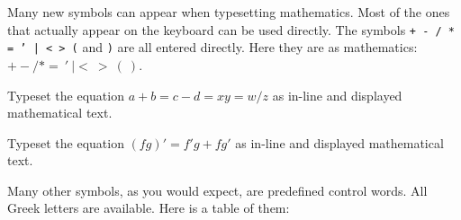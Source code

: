 Many new symbols can appear when typesetting mathematics.  Most 
of the ones that actually appear on the keyboard can be used 
directly. The symbols {\tt + - / * = ' | < > (} and {\tt )} are 
all entered directly. Here they are as mathematics: $+ - / * =\> 
'\> | <\> >\> ( \> )$. 

\exercise Typeset the equation $a+b=c-d=xy=w/z$ as in-line and 
displayed mathematical text. 

\exercise Typeset the equation $(fg)' = f'g + fg'$ as in-line and 
displayed mathematical text. 
\bigskip 

Many other symbols, as you would expect, are predefined control 
words.  All Greek letters are available.  Here is a table of them: 



